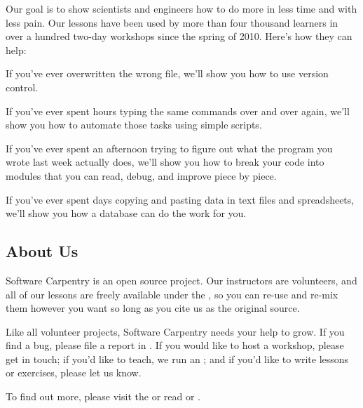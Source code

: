 Our goal is to show scientists and engineers how to do more in less time
and with less pain. Our lessons have been used by more than four
thousand learners in over a hundred two-day workshops since the spring
of 2010. Here's how they can help:

\begin{swcitemize}
\item
  If you've ever overwritten the wrong file, we'll show you how to use
  version control.
\item
  If you've ever spent hours typing the same commands over and over
  again, we'll show you how to automate those tasks using simple
  scripts.
\item
  If you've ever spent an afternoon trying to figure out what the
  program you wrote last week actually does, we'll show you how to break
  your code into modules that you can read, debug, and improve piece by
  piece.
\item
  If you've ever spent days copying and pasting data in text files and
  spreadsheets, we'll show you how a database can do the work for you.
\end{swcitemize}

\subsection{About Us}

Software Carpentry is an open source project. Our instructors are
volunteers, and all of our lessons are freely available under the
, so you can re-use and re-mix them however you want
so long as you cite us as the original source.

Like all volunteer projects, Software Carpentry needs your help to grow.
If you find a bug, please file a report in
. If you would
like to host a workshop, please
get in touch; if you'd like
to teach, we run an
; and if you'd like to write lessons or exercises, please
let us know.

To find out more, please visit the
or read
 or
.

